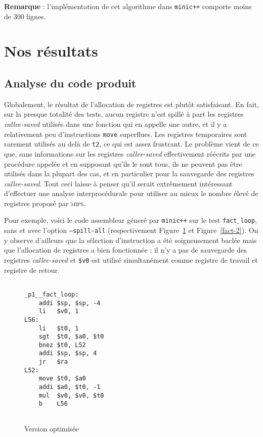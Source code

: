 \documentclass[11pt, a4paper]{article}
\newcommand{\prog}[1]{{\tt#1}}
\newcommand{\underscore}{$\_\,$}
\begin{document}
\medskip


\textbf{Remarque} : l'implémentation de cet algorithme dans \prog{minic++} comporte moins de 300 lignes.


\section{Nos résultats}
 
\subsection{Analyse du code produit}

Globalement, le résultat de l'allocation de registres est plutôt satisfaisant. En fait, sur la presque totalité des tests, aucun registre n'est spillé à part les registres \textit{callee-saved} utilisés dans une fonction qui en appelle une autre, et il y a relativement peu d'instructions \prog{move} superflues. Les registres temporaires sont rarement utilisés au delà de \prog{t2}, ce qui est assez frustrant. Le problème vient de ce que, sans informations sur les registres \textit{caller-saved} effectivement réécrits par une procédure appelée et en supposant qu'ils le sont tous, ils ne peuvent pas être utilisés dans la plupart des cas, et en particulier pour la sauvegarde des registres \textit{callee-saved}. Tout ceci laisse à penser qu'il serait extrêmement intéressant d'effectuer une analyse interprocédurale pour utiliser au mieux le nombre élevé de registres proposé par \textsc{mips}.

\medskip

Pour exemple, voici le code assembleur géneré par \prog{minic++} sur le test \prog{fact\underscore{}loop}, sans et avec l'option \prog{--spill-all} (respectivement Figure~\ref{fact-1} et Figure~\ref{fact-2}). On y observe d'ailleurs que la sélection d'instruction a été soigneusement baclée mais que l'allocation de registres a bien fonctionnée : il n'y a pas de sauvegarde des registres \textit{callee-saved} et \prog{\$v0} est utilisé simultanément comme registre de travail et registre de retour.


\begin{figure}[h]
\centering
\begin {lstlisting}[basicstyle=\ttfamily, frame=none]  %

_p1__fact_loop:
	addi $sp, $sp, -4
	li   $v0, 1
L56:
	li   $t0, 1
	sgt  $t0, $a0, $t0
	bnez $t0, L52
	addi $sp, $sp, 4
	jr   $ra
L52:
	move $t0, $a0
	addi $a0, $t0, -1
	mul  $v0, $v0, $t0
	b    L56


\end{lstlisting}
\caption{Version optimisée}
\label{fact-1}
\end{figure}
\end{document}
